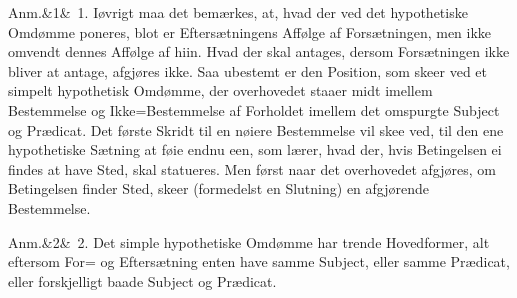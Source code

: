 \documentclass[12pt]{book}
\def\sperr#1{#1}%
\def\textit#1{#1}%
\def\emph#1{#1}%
\newcommand{\sperr}[1]{\textls[180]{#1}}
\newcommand{\anm}[1]{%
  \par\vspace{0.5\baselineskip}%
  \noindent\hspace{\parindent}\sperr{Anm.}\ifx&#1&\else~\textit{#1}.\fi
  \enspace\ignorespaces
}
\begin{document}
\anm{1} Iøvrigt maa det bemærkes, at, hvad der ved det hypothetiske Omdømme
poneres, blot er Eftersætningens Affølge af Forsætningen, men ikke omvendt dennes
Affølge af hiin. Hvad der skal \emph{antages}, dersom Forsætningen ikke bliver at
antage, afgjøres ikke. Saa ubestemt er den Position, som skeer ved et simpelt
hypothetisk Omdømme, der overhovedet staaer midt imellem Bestemmelse og
\emph{Ikke=Bestemmelse} af Forholdet imellem det omspurgte Subject og Prædicat.
Det første Skridt til en nøiere Bestemmelse vil skee ved, til den ene
hypothetiske Sætning at føie endnu een, som lærer, hvad der, hvis Betingelsen ei
findes at have Sted, skal statueres. Men først naar det overhovedet afgjøres, om
Betingelsen finder Sted, skeer (formedelst en Slutning) en afgjørende
Bestemmelse.

\anm{2} Det simple hypothetiske Omdømme har trende Hovedformer, alt eftersom
For= og Eftersætning enten have samme Subject, eller samme Prædicat, eller
forskjelligt baade Subject og Prædicat.
\end{document}
